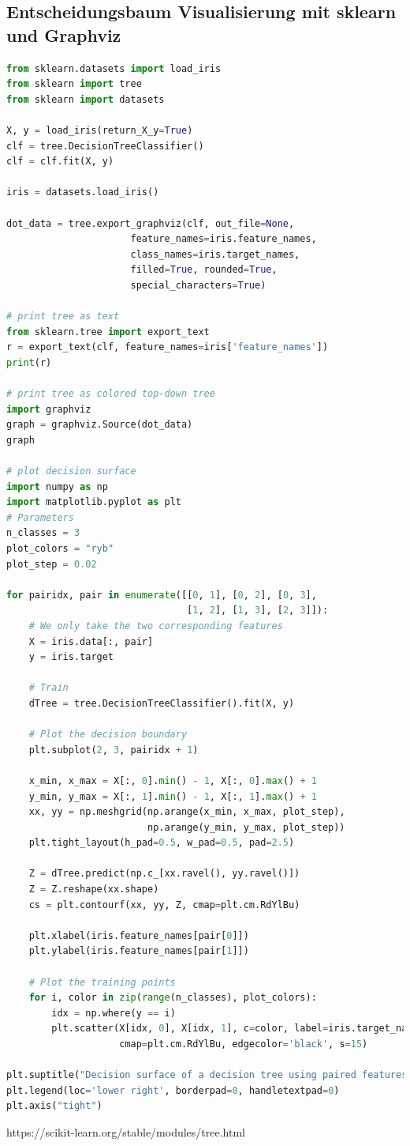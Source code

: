 \documentclass[
  12pt, %
  a4paper, %
  oneside, %
  openany, 
  numbers=noenddot, %
  BCOR=5mm, %
  parskip=half*, %
  thesis, %
]{bfhbook}
\begin{document}
\subsection{Entscheidungsbaum Visualisierung mit sklearn und Graphviz}
\begin{lstlisting}[language=Python, caption=Decision Tree Visualisierung]
from sklearn.datasets import load_iris
from sklearn import tree
from sklearn import datasets

X, y = load_iris(return_X_y=True)
clf = tree.DecisionTreeClassifier()
clf = clf.fit(X, y)

iris = datasets.load_iris()

dot_data = tree.export_graphviz(clf, out_file=None, 
                      feature_names=iris.feature_names,  
                      class_names=iris.target_names,  
                      filled=True, rounded=True,  
                      special_characters=True)  

# print tree as text
from sklearn.tree import export_text
r = export_text(clf, feature_names=iris['feature_names'])
print(r)

# print tree as colored top-down tree
import graphviz
graph = graphviz.Source(dot_data)  
graph 

# plot decision surface
import numpy as np
import matplotlib.pyplot as plt
# Parameters
n_classes = 3
plot_colors = "ryb"
plot_step = 0.02

for pairidx, pair in enumerate([[0, 1], [0, 2], [0, 3],
                                [1, 2], [1, 3], [2, 3]]):
    # We only take the two corresponding features
    X = iris.data[:, pair]
    y = iris.target
    
    # Train
    dTree = tree.DecisionTreeClassifier().fit(X, y)

    # Plot the decision boundary
    plt.subplot(2, 3, pairidx + 1)

    x_min, x_max = X[:, 0].min() - 1, X[:, 0].max() + 1
    y_min, y_max = X[:, 1].min() - 1, X[:, 1].max() + 1
    xx, yy = np.meshgrid(np.arange(x_min, x_max, plot_step),
                         np.arange(y_min, y_max, plot_step))
    plt.tight_layout(h_pad=0.5, w_pad=0.5, pad=2.5)

    Z = dTree.predict(np.c_[xx.ravel(), yy.ravel()])
    Z = Z.reshape(xx.shape)
    cs = plt.contourf(xx, yy, Z, cmap=plt.cm.RdYlBu)

    plt.xlabel(iris.feature_names[pair[0]])
    plt.ylabel(iris.feature_names[pair[1]])

    # Plot the training points
    for i, color in zip(range(n_classes), plot_colors):
        idx = np.where(y == i)
        plt.scatter(X[idx, 0], X[idx, 1], c=color, label=iris.target_names[i],
                    cmap=plt.cm.RdYlBu, edgecolor='black', s=15)

plt.suptitle("Decision surface of a decision tree using paired features")
plt.legend(loc='lower right', borderpad=0, handletextpad=0)
plt.axis("tight")
\end{lstlisting}
https://scikit-learn.org/stable/modules/tree.html
\end{document}
